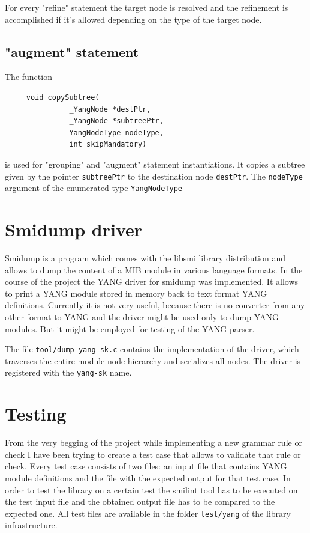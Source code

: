 \documentclass[conference]{IEEEtran}
\begin{document}
For every "refine" statement the target node is resolved and the refinement is accomplished if it's allowed depending on the type of the target node.


\subsection{"augment" statement}
The function
\small
\begin{verbatim}
     void copySubtree(
               _YangNode *destPtr, 
               _YangNode *subtreePtr, 
               YangNodeType nodeType, 
               int skipMandatory)
\end{verbatim}
\normalsize
is used for "grouping" and "augment" statement instantiations. It copies a subtree given by the pointer \texttt{subtreePtr} to the destination node \texttt{destPtr}.  
The \texttt{nodeType} argument of the enumerated type \texttt{YangNodeType}


\section{Smidump driver}
Smidump is a program which comes with the libsmi library distribution and allows to dump the content of a MIB module in various language formats. In the course of the project the YANG driver for smidump was implemented. It allows to print a YANG module stored in memory back to text format YANG definitions. Currently it is not very useful, because there is no converter from any other format to YANG and the driver might be used only to dump YANG modules. But it might be employed for testing of the YANG parser.

The file \texttt{tool/dump-yang-sk.c} contains the implementation of the driver, which traverses the entire module node hierarchy and serializes all nodes. The driver is registered with the \texttt{yang-sk} name.

\section{Testing}
From the very begging of the project  while implementing a new grammar rule or check I have been trying to create a test case that allows to validate that rule or check. Every test case consists of two files: an input file that contains YANG module definitions and the file with the expected output for that test case. In order to test the library on a certain test the smilint tool has to be executed on the test input file and the obtained output file has to be compared to the expected one. All test files are available in the folder 	\texttt{test/yang} of the library infrastructure.
\end{document}

